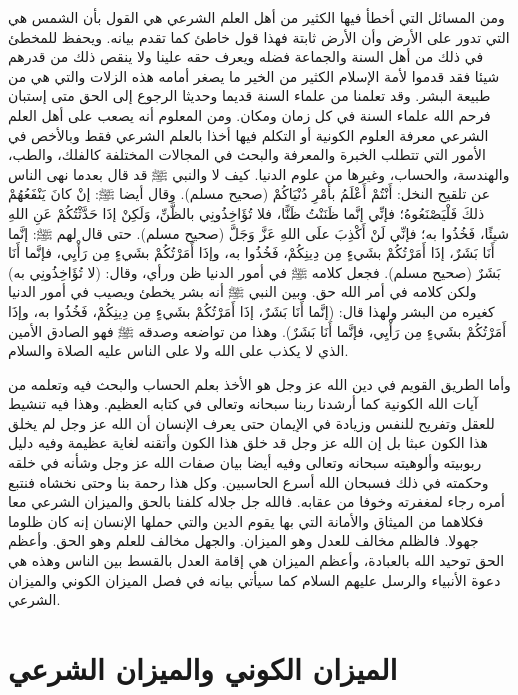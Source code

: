 ومن المسائل التي أخطأ فيها الكثير من أهل العلم الشرعي هي القول بأن الشمس هي التي تدور على الأرض وأن الأرض ثابتة فهذا قول خاطئ كما تقدم بيانه. ويحفظ للمخطئ في ذلك من أهل السنة والجماعة فضله ويعرف حقه علينا ولا ينقص ذلك من قدرهم شيئا فقد قدموا لأمة الإسلام الكثير من الخير ما يصغر أمامه هذه الزلات والتي هي من طبيعة البشر. وقد تعلمنا من علماء السنة قديما وحديثا الرجوع إلى الحق متى إستبان فرحم الله علماء السنة في كل زمان ومكان. ومن المعلوم أنه يصعب على أهل العلم الشرعي معرفة العلوم الكونية أو التكلم فيها أخذا بالعلم الشرعي فقط وبالأخص في الأمور التي تتطلب الخبرة والمعرفة والبحث في المجالات المختلفة كالفلك، والطب، والهندسة، والحساب، وغيرها من علوم الدنيا. كيف لا والنبي ﷺ قد قال بعدما نهى الناس عن تلقيح النخل: أَنْتُمْ أَعْلَمُ بأَمْرِ دُنْيَاكُمْ {\footnotesize (صحيح مسلم)}. وقال أيضا ﷺ: إنْ كانَ يَنْفَعُهُمْ ذلكَ فَلْيَصْنَعُوهُ؛ فإنِّي إنَّما ظَنَنْتُ ظَنًّا، فلا تُؤَاخِذُونِي بالظَّنِّ، وَلَكِنْ إذَا حَدَّثْتُكُمْ عَنِ اللهِ شيئًا، فَخُذُوا به؛ فإنِّي لَنْ أَكْذِبَ علَى اللهِ عَزَّ وَجَلَّ {\footnotesize (صحيح مسلم)}. حتى قال لهم ﷺ: إنَّما أَنَا بَشَرٌ، إذَا أَمَرْتُكُمْ بشَيءٍ مِن دِينِكُمْ، فَخُذُوا به، وإذَا أَمَرْتُكُمْ بشَيءٍ مِن رَأْيِي، فإنَّما أَنَا بَشَرٌ {\footnotesize (صحيح مسلم)}. فجعل كلامه ﷺ في أمور الدنيا ظن ورأي، وقال: (لا تُؤَاخِذُونِي به) ولكن كلامه في أمر الله حق. وبين النبي ﷺ أنه بشر يخطئ ويصيب في أمور الدنيا كغيره من البشر ولهذا قال:  (إنَّما أَنَا بَشَرٌ، إذَا أَمَرْتُكُمْ بشَيءٍ مِن دِينِكُمْ، فَخُذُوا به، وإذَا أَمَرْتُكُمْ بشَيءٍ مِن رَأْيِي، فإنَّما أَنَا بَشَرٌ). وهذا من تواضعه وصدقه ﷺ فهو الصادق الأمين الذي لا يكذب على الله ولا على الناس عليه الصلاة والسلام.

وأما الطريق القويم في دين الله عز وجل هو الأخذ بعلم الحساب والبحث فيه وتعلمه من آيات الله الكونية كما أرشدنا ربنا سبحانه وتعالى في كتابه العظيم. وهذا فيه تنشيط للعقل وتفريح للنفس وزيادة في الإيمان حتى يعرف الإنسان أن الله عز وجل لم يخلق هذا الكون عبثا بل إن الله عز وجل قد خلق هذا الكون وأتقنه لغاية عظيمة وفيه دليل ربوبيته وألوهيته سبحانه وتعالى وفيه أيضا بيان صفات الله عز وجل وشأنه في خلقه وحكمته في ذلك فسبحان الله أسرع الحاسبين. وكل هذا رحمة بنا وحتى نخشاه فنتبع أمره رجاء لمغفرته وخوفا من عقابه. فالله جل جلاله كلفنا بالحق والميزان الشرعي معا فكلاهما من الميثاق والأمانة التي بها يقوم الدين والتي حملها الإنسان إنه كان ظلوما جهولا. فالظلم مخالف للعدل وهو الميزان. والجهل مخالف للعلم وهو الحق. وأعظم الحق توحيد الله بالعبادة، وأعظم الميزان هي إقامة العدل بالقسط بين الناس وهذه هي دعوة الأنبياء والرسل عليهم السلام كما سيأتي بيانه في فصل الميزان الكوني والميزان الشرعي.


\chapter{الميزان الكوني والميزان الشرعي}

